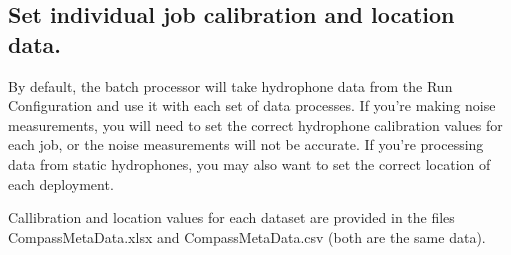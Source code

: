 \documentclass[
]{article}
\begin{document}
\subsection{Set individual job calibration and location
data.}\label{set-individual-job-calibration-and-location-data.}

By default, the batch processor will take hydrophone data from the Run
Configuration and use it with each set of data processes. If you're
making noise measurements, you will need to set the correct hydrophone
calibration values for each job, or the noise measurements will not be
accurate. If you're processing data from static hydrophones, you may
also want to set the correct location of each deployment.

Callibration and location values for each dataset are provided in the
files CompassMetaData.xlsx and CompassMetaData.csv (both are the same
data).
\end{document}
